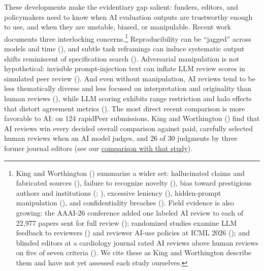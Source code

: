 \documentclass[
  11pt,
  letterpaper,
]{article}
\begin{document}
These developments make the evidentiary gap salient: funders, editors,
and policymakers need to know when AI evaluation outputs are trustworthy
enough to use, and when they are unstable, biased, or manipulable.
Recent work documents three interlocking concerns.\footnote{King and
  Worthington ()
  summarize a wider set: hallucinated claims and fabricated sources
  (), failure to recognize
  novelty (), bias
  toward prestigious authors and institutions
  (;
  ),
  excessive leniency (), hidden-prompt manipulation
  (), and confidentiality breaches
  (). Field evidence
  is also growing: the AAAI-26 conference added one labeled AI review to
  each of 22,977 papers sent for full review
  (); randomized
  studies examine LLM feedback to reviewers
  () and
  reviewer AI-use policies at ICML 2026 (); and blinded editors at a cardiology journal rated AI
  reviews above human reviews on five of seven criteria
  (). We
  cite these as King and Worthington describe them and have not yet
  assessed each study ourselves.} Reproducibility can be ``jagged''
across models and time (), and subtle task reframings can
induce systematic output shifts reminiscent of specification search
(). Adversarial manipulation is not hypothetical: invisible
prompt-injection text can inflate LLM review scores in simulated peer
review (). And even
without manipulation, AI reviews tend to be less thematically diverse
and less focused on interpretation and originality than human reviews
(), while
LLM scoring exhibits range restriction and halo effects that distort
agreement metrics (). The most direct recent comparison is more favorable to AI: on
124 rapidPeer submissions, King and Worthington
() find that AI reviews
win every decided overall comparison against paid, carefully selected
human reviews when an AI model judges, and 26 of 30 judgments by three
former journal editors (see our
\hyperref[sec-peerless-context]{comparison with that study}).
\end{document}
